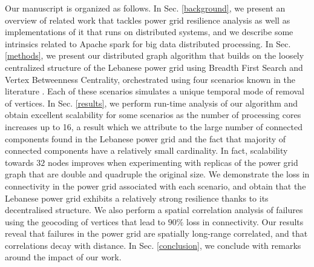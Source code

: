 Our manuscript is organized as follows. In Sec. \ref{background}, we present an overview of related work that tackles power grid resilience analysis as well as implementations of it that runs on distributed systems, and we describe some intrinsics related to Apache spark for big data distributed processing. In Sec. \ref{methods}, we present our distributed graph algorithm that builds on the loosely centralized structure of the Lebanese power grid using Breadth First Search and Vertex Betweenness Centrality, orchestrated using four scenarios known in the literature \cite{2000Natur.406..378A}. Each of these scenarios simulates a unique temporal mode of removal of vertices. In Sec. \ref{results}, we perform run-time analysis of our algorithm and obtain excellent scalability for some scenarios as the number of processing cores increases up to 16, a result which we attribute to the large number of connected components found in the Lebanese power grid and the fact that majority of connected components have a relatively small cardinality. In fact, scalability towards $32$ nodes improves when experimenting with replicas of the power grid graph that are double and quadruple the original size. We demonstrate the loss in connectivity in the power grid associated with each scenario, and obtain that the Lebanese power grid exhibits a relatively strong resilience thanks to its decentralised structure. We also perform a spatial correlation analysis of failures using the geocoding of vertices that lead to $90\%$ loss in connectivity. Our results reveal that failures in the power grid are spatially long-range correlated, and that correlations decay with distance. In Sec. \ref{conclusion}, we conclude with remarks around the impact of our work.%





